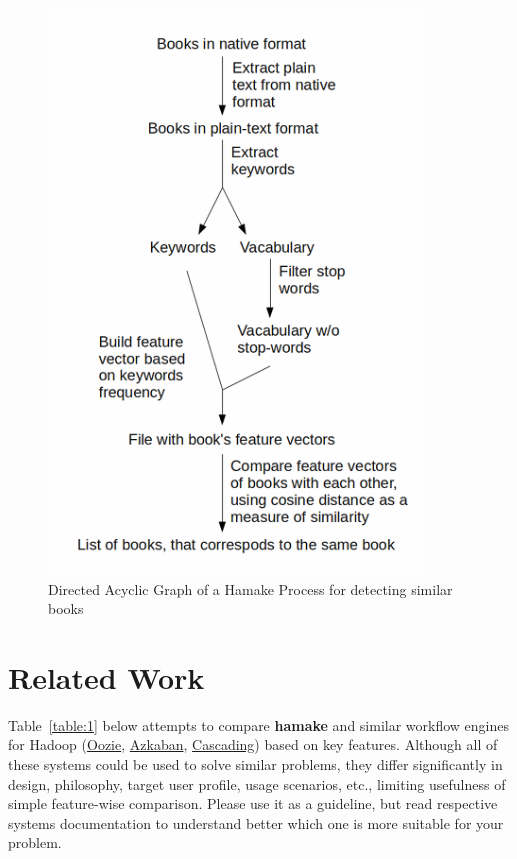 \documentclass[10pt,conference,letterpaper]{IEEEtran}
\begin{document}
\begin{figure}[htp]
\centering
\includegraphics[width=10cm]{SimilarityAlgDAG.png}
\caption{Directed Acyclic Graph of a Hamake Process for detecting similar books}
\label{fig:SimilarityAlgDAG}
\end{figure}

\section{Related Work}

Table~\ref{table:1} below attempts to compare \textbf{hamake} and
similar workflow engines for Hadoop
(\href{http://github.com/tucu00/oozie1}{Oozie},
\href{http://sna-projects.com/azkaban/}{Azkaban},
\href{http://www.cascading.org/}{Cascading}) based on key
features. Although all of these systems could be used to solve similar
problems, they differ significantly in design, philosophy, target user
profile, usage scenarios, etc., limiting usefulness of simple
feature-wise comparison. Please use it as a guideline, but read
respective systems documentation to understand better which one is
more suitable for your problem.
\end{document}
